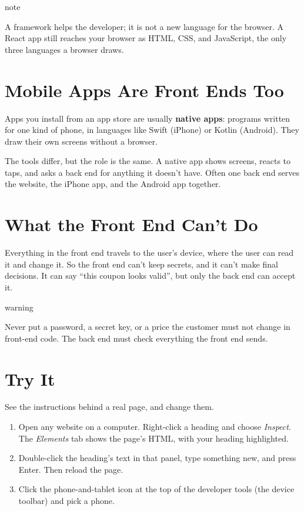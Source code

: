 \begin{callout}{note}

A framework helps the developer; it is not a new language for the browser. A React app still reaches your browser as HTML, CSS, and JavaScript, the only three languages a browser draws.

\end{callout}

\section{Mobile Apps Are Front Ends Too}\label{02-the-front-end:mobile-apps-are-front-ends-too}

Apps you install from an app store are usually \textbf{native apps}: programs written for one kind of phone, in languages like Swift (iPhone) or Kotlin (Android). They draw their own screens without a browser.

The tools differ, but the role is the same. A native app shows screens, reacts to taps, and asks a back end for anything it doesn't have. Often one back end serves the website, the iPhone app, and the Android app together.

\section{What the Front End Can't Do}\label{02-the-front-end:what-the-front-end-cant-do}

Everything in the front end travels to the user's device, where the user can read it and change it. So the front end can't keep secrets, and it can't make final decisions. It can say ``this coupon looks valid'', but only the back end can accept it.

\begin{callout}{warning}

Never put a password, a secret key, or a price the customer must not change in front-end code. The back end must check everything the front end sends.

\end{callout}

\section{Try It}\label{02-the-front-end:try-it}

See the instructions behind a real page, and change them.

\begin{enumerate}
\def\labelenumi{\arabic{enumi}.}
\tightlist
\item
  Open any website on a computer. Right-click a heading and choose \emph{Inspect}. The \emph{Elements} tab shows the page's HTML, with your heading highlighted.
\item
  Double-click the heading's text in that panel, type something new, and press Enter. Then reload the page.
\item
  Click the phone-and-tablet icon at the top of the developer tools (the device toolbar) and pick a phone.
\end{enumerate}

